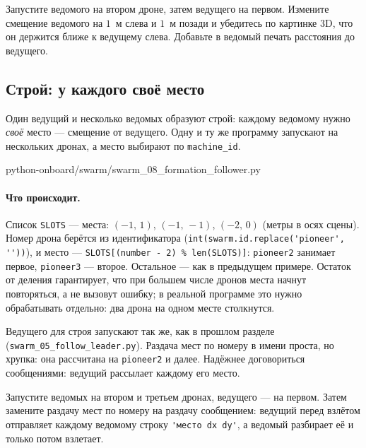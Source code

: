 \begin{taskbox}
Запустите ведомого на втором дроне, затем ведущего на первом. Измените смещение ведомого на $1$~м слева и $1$~м позади и убедитесь по картинке 3D, что он держится ближе к ведущему слева. Добавьте в ведомый печать расстояния до ведущего.
\end{taskbox}

\subsection{Строй: у каждого своё место}
\label{sec:swarm-formation}

Один ведущий и несколько ведомых образуют строй: каждому ведомому нужно \emph{своё} место --- смещение от ведущего. Одну и ту же программу запускают на нескольких дронах, а место выбирают по \texttt{machine\_id}.

\begin{codefile}[python]{python-onboard/swarm/swarm_08_formation_follower.py}
\end{codefile}

\paragraph{Что происходит.} Список \verb|SLOTS| --- места: $(-1,\,1)$, $(-1,\,-1)$, $(-2,\,0)$ (метры в осях сцены). Номер дрона берётся из идентификатора (\verb|int(swarm.id.replace('pioneer', ''))|), и место --- \verb|SLOTS[(number - 2) % len(SLOTS)]|: \texttt{pioneer2} занимает первое, \texttt{pioneer3} --- второе. Остальное --- как в предыдущем примере. Остаток от деления гарантирует, что при большем числе дронов места начнут повторяться, а не вызовут ошибку; в реальной программе это нужно обрабатывать отдельно: два дрона на одном месте столкнутся.

Ведущего для строя запускают так же, как в прошлом разделе (\texttt{swarm\_05\_follow\_leader.py}). Раздача мест по номеру в имени проста, но хрупка: она рассчитана на \texttt{pioneer2} и далее. Надёжнее договориться сообщениями: ведущий рассылает каждому его место.

\begin{taskbox}[Треугольник]
Запустите ведомых на втором и третьем дронах, ведущего --- на первом. Затем замените раздачу мест по номеру на раздачу сообщением: ведущий перед взлётом отправляет каждому ведомому строку \verb|'место dx dy'|, а ведомый разбирает её и только потом взлетает.
\end{taskbox}

